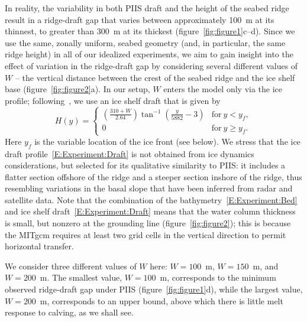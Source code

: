 \documentclass[draft]{agujournal2019}
\begin{document}
In reality, the variability in both PIIS draft and the height of the seabed ridge result in a ridge-draft gap that varies between approximately 100 m at its thinnest, to greater than 300 m at its thickest (figure~\ref{fig:figure1}c--d). Since we use the same, zonally uniform, seabed geometry (and, in particular, the same ridge height) in all of our idealized experiments, we aim to gain insight into the effect of variation in the ridge-draft gap by considering several different values of $W$ -- the vertical distance between the crest of the seabed ridge and the ice shelf base (figure~\ref{fig:figure2}a). In our setup, $W$ enters the model only via the ice profile; following~, we use an ice shelf draft that is given by
\begin{equation}\label{E:Experiment:Draft}
    H(y) = \begin{cases}
    \left(\frac{310 + W}{2.64}\right)\tan^{-1}\left(\frac{y}{5882} -3\right) & \text{for}~y < y_f,\\
    0  & \text{for}~y \geq y_f.
    \end{cases}
\end{equation}
Here $y_f$ is the variable location of the ice front (see below). We stress that the ice draft profile~\eqref{E:Experiment:Draft} is not obtained from ice dynamics considerations, but selected for its qualitative similarity to PIIS: it includes a flatter section offshore of the ridge and a steeper section inshore of the ridge, thus resembling variations in the basal slope that have been inferred from radar and satellite data. Note that the combination of the bathymetry~\eqref{E:Experiment:Bed} and ice shelf draft~\eqref{E:Experiment:Draft} means that the water column thickness is small, but nonzero at the grounding line (figure~\ref{fig:figure2}); this is because the MITgcm requires at least two grid cells in the vertical direction to permit horizontal transfer.

We consider three different values of $W$ here: $W=100$~m, $W=150$~m, and $W=200$~m. The smallest value, $W=100$~m, corresponds to the minimum observed ridge-draft gap under PIIS (figure~\ref{fig:figure1}d), while the largest value, $W=200$~m, corresponds to an upper bound, above which there is little melt response to calving, as we shall see.
\end{document}

